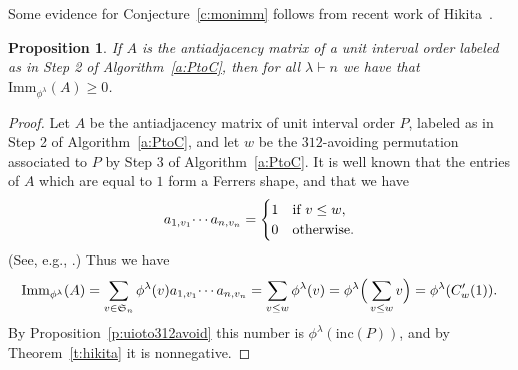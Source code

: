 \documentclass[12pt]{amsart}
\newtheorem{prop}[thm]{Proposition}
\numberwithin{equation}{section}
\newcommand{\sn}{\mathfrak{S}_n}
\newcommand{\imm}[1]{\mathrm{Imm}_{#1}}
\newcommand{\ntnsp}{\negthinspace}
\newcommand{\inc}{\mathrm{inc}}
\newcommand{\permmon}[2]{#1_{1,#2_1} \ntnsp\cdots {#1}_{n,#2_n}}
\begin{document}
Some evidence for Conjecture~\ref{c:monimm} follows from recent work
of Hikita~\cite{HikitaProof}.
\begin{prop}
  If $A$ is the antiadjacency matrix of a unit interval order
  labeled as in Step 2 of Algorithm~\ref{a:PtoC},
  then for all $\lambda \vdash n$ we have that $\imm{\phi^\lambda}(A) \geq 0$.
\end{prop}
\begin{proof}
  Let $A$ be the antiadjacency matrix of unit interval order $P$,
  labeled as in Step 2 of Algorithm~\ref{a:PtoC},
  and let $w$ be the $312$-avoiding permutation
  associated to $P$ by Step 3 of Algorithm~\ref{a:PtoC}.
  It is well known that the entries of $A$ which are equal to $1$
  form a Ferrers shape, and that we have
  \begin{equation*}
    \permmon av = \begin{cases} 1 &\text{if $v \leq w$},\\
      0 &\text{otherwise}.
    \end{cases}
  \end{equation*}
  (See, e.g., \cite[Prop.\,19, Prop.\,22]{WatsonBruhat}.)  Thus we have
  \begin{equation*}
    \imm{\phi^\lambda}(A) =
    \sum_{v \in \sn} \phi^\lambda(v) \permmon av
    = \sum_{v \leq w} \phi^\lambda(v) 
    = \phi^\lambda \Big( \sum_{v \leq w} v \Big)
    = \phi^\lambda(C'_w(1)).
  \end{equation*}
  By Proposition~\ref{p:uioto312avoid} this number is $\phi^\lambda(\inc(P))$,
  and by Theorem~\ref{t:hikita} it is nonnegative.
\end{proof}
%
\end{document}
